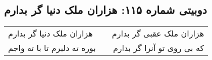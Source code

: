 \begin{center}
\section*{دوبیتی شماره ۱۱۵: هزاران ملک دنیا گر بدارم}
\label{sec:115}
\begin{longtable}{l p{0.5cm} r}
هزاران ملک دنیا گر بدارم
&&
هزاران ملک عقبی گر بدارم
\\
بوره ته دلبرم تا با ته واجم
&&
که بی روی تو آنرا گر بدارم
\\
\end{longtable}
\end{center}
